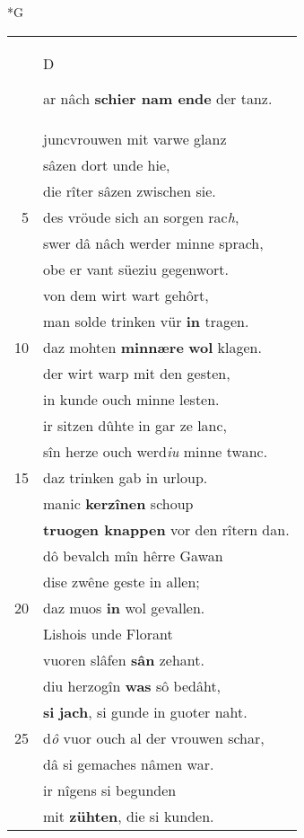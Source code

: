 \documentclass[8pt,a4paper,notitlepage]{article}
\begin{document}
\newpage
\begin{table}[ht]
\begin{minipage}[t]{0.5\linewidth}
\small
\begin{center}*G
\end{center}
\begin{tabular}{rl}
 & \begin{large}D\end{large}ar nâch \textbf{schier nam ende} der tanz.\\ 
 & juncvrouwen mit varwe glanz\\ 
 & sâzen dort unde hie,\\ 
 & die rîter sâzen zwischen sie.\\ 
5 & des vröude sich an sorgen rac\textit{h},\\ 
 & swer dâ nâch werder minne sprach,\\ 
 & obe er vant süeziu gegenwort.\\ 
 & von dem wirt wart gehôrt,\\ 
 & man solde trinken vür \textbf{in} tragen.\\ 
10 & daz mohten \textbf{minnære} \textbf{wol} klagen.\\ 
 & der wirt warp mit den gesten,\\ 
 & in kunde ouch minne lesten.\\ 
 & ir sitzen dûhte in gar ze lanc,\\ 
 & sîn herze ouch werd\textit{iu} minne twanc.\\ 
15 & daz trinken gab in urloup.\\ 
 & manic \textbf{kerzînen} schoup\\ 
 & \textbf{truogen knappen} vor den rîtern dan.\\ 
 & dô bevalch mîn hêrre Gawan\\ 
 & dise zwêne geste in allen;\\ 
20 & daz muos \textbf{in} wol gevallen.\\ 
 & Lishois unde Florant\\ 
 & vuoren slâfen \textbf{sân} zehant.\\ 
 & diu herzogîn \textbf{was} sô bedâht,\\ 
 & \textbf{si} \textbf{jach}, si gunde in guoter naht.\\ 
25 & d\textit{ô} vuor ouch al der vrouwen schar,\\ 
 & dâ si gemaches nâmen war.\\ 
 & ir nîgens si begunden\\ 
 & mit \textbf{zühten}, die si kunden.\\ 

\end{tabular}
\end{minipage}
\end{table}
\end{document}
